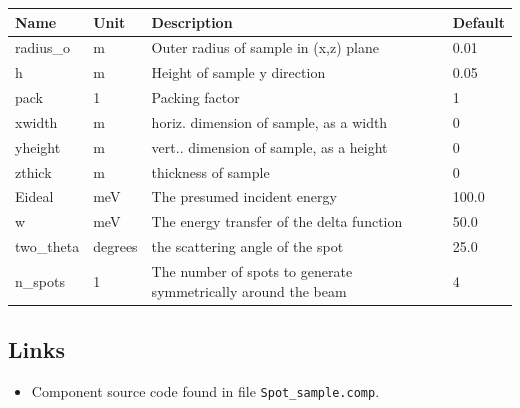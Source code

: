 \begin{longtable}{p{}p{}p{}p{}}
\toprule
\textbf{Name} & \textbf{Unit} & \textbf{Description} & \textbf{Default} \\
\midrule
\endhead
radius\_o & m & Outer radius of sample in (x,z) plane & 0.01 \\
h & m & Height of sample y direction & 0.05 \\
pack & 1 & Packing factor & 1 \\
xwidth & m & horiz. dimension of sample, as a width & 0 \\
yheight & m & vert.. dimension of sample, as a height & 0 \\
zthick & m & thickness of sample & 0 \\
Eideal & meV & The presumed incident energy & 100.0 \\
w & meV & The energy transfer of the delta function & 50.0 \\
two\_theta & degrees & the scattering angle of the spot & 25.0 \\
n\_spots & 1 & The number of spots to generate symmetrically around the beam & 4 \\
\bottomrule
\end{longtable}

\subsection*{Links}
\begin{itemize}
  \item Component source code found in file \texttt{Spot\_sample.comp}.
\end{itemize}
